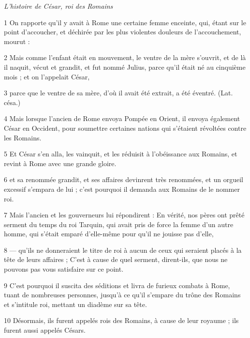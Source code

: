 \par \textit{L'histoire de César, roi des Romains}

\par 1 On rapporte qu'il y avait à Rome une certaine femme enceinte, qui, étant sur le point d'accoucher, et déchirée par les plus violentes douleurs de l'accouchement, mourut :

\par 2 Mais comme l'enfant était en mouvement, le ventre de la mère s'ouvrit, et de là il naquit, vécut et grandit, et fut nommé Julius, parce qu'il était né au cinquième mois ; et on l'appelait César,

\par 3 parce que le ventre de sa mère, d'où il avait été extrait, a été éventré. (Lat. césa.)

\par 4 Mais lorsque l'ancien de Rome envoya Pompée en Orient, il envoya également César en Occident, pour soumettre certaines nations qui s'étaient révoltées contre les Romains.

\par 5 Et César s'en alla, les vainquit, et les réduisit à l'obéissance aux Romains, et revint à Rome avec une grande gloire.

\par 6 et sa renommée grandit, et ses affaires devinrent très renommées, et un orgueil excessif s'empara de lui ; c'est pourquoi il demanda aux Romains de le nommer roi.

\par 7 Mais l'ancien et les gouverneurs lui répondirent : En vérité, nos pères ont prêté serment du temps du roi Tarquin, qui avait pris de force la femme d'un autre homme, qui s'était emparé d'elle-même pour qu'il ne jouisse pas d'elle,

\par 8 — qu'ils ne donneraient le titre de roi à aucun de ceux qui seraient placés à la tête de leurs affaires ; C'est à cause de quel serment, dirent-ils, que nous ne pouvons pas vous satisfaire sur ce point.

\par 9 C'est pourquoi il suscita des séditions et livra de furieux combats à Rome, tuant de nombreuses personnes, jusqu'à ce qu'il s'empare du trône des Romains et s'intitule roi, mettant un diadème sur sa tête.

\par 10 Désormais, ils furent appelés rois des Romains, à cause de leur royaume ; ils furent aussi appelés Césars.

